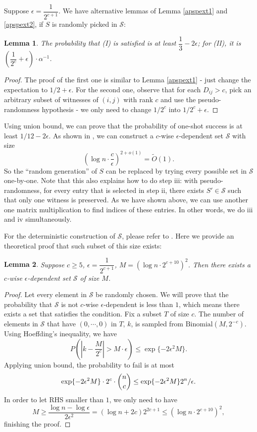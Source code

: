 \documentclass[11pt]{article}
\theoremstyle{plain}
\newtheorem{lemma}{Lemma}[section]
\begin{document}
Suppose $\epsilon=\dfrac{1}{2^{c+1}}$. We have alternative lemmas of Lemma \ref{apspext1} and \ref{apspext2}, if $S$ is randomly picked in $\mathcal{S}$:

\begin{lemma}
\label{apspext4}
The probability that (I) is satisfied is at least $\dfrac{1}{3}-2\epsilon$; for (II), it is $(\dfrac{1}{2^c}+\epsilon)\cdot \alpha^{-1}$.
\end{lemma}

\begin{proof}
The proof of the first one is similar to Lemma \ref{apspext1} - just change the expectation to $1/2+\epsilon$. For the second one, observe that for each $D_{ij}>c$, pick an arbitrary subset of witnesses of $(i,j)$ with rank $c$ and use the pseudo-randomness hypothesis - we only need to change $1/2^c$ into $1/2^c+\epsilon$.
\end{proof}

Using union bound, we can prove that the probability of one-shot success is at least $1/12-2\epsilon$. As shown in \cite{10.1145/100216.100244}, we can construct a $c$-wise $\epsilon$-dependent set $\mathcal{S}$ with size
$$(\log n\cdot\dfrac{c}{\epsilon})^{2+o(1)}=\tilde O(1).$$
So the ``random generation'' of $S$ can be replaced by trying every possible set in $\mathcal{S}$ one-by-one. Note that this also explains how to do step iii: with pseudo-randomness, for every entry that is selected in step ii, there exists $S'\in \mathcal{S}$ such that only one witness is preserved. As we have shown above, we can use another one matrix multiplication to find indices of these entries. In other words, we do iii and iv simultaneously.

For the deterministic construction of $\mathcal{S}$, please refer to \cite{10.1145/100216.100244}. Here we provide an theoretical proof that such subset of this size exists:

\begin{lemma}
\label{psr1}
Suppose $c\ge 5$, $\epsilon=\dfrac{1}{2^{c+1}}$, $M=(\log n\cdot 2^{c+10})^2$. Then there exists a $c$-wise $\epsilon$-dependent set $\mathcal{S}$ of size $M$.
\end{lemma}

\begin{proof}
Let every element in $\mathcal{S}$ be randomly chosen. We will prove that the probability that $\mathcal{S}$ is not $c$-wise $\epsilon$-dependent is less than $1$, which means there exists a set that satisfies the condition. Fix a subset $T$ of size $c$. The number of elements in $\mathcal{S}$ that have $(0,\cdots,0)$ in $T$, $k$, is sampled from $\text{Binomial}(M,2^{-c})$. Using Hoeffding's inequality, we have
$$P(|k-\dfrac{M}{2^{c}}|>M\cdot \epsilon) \le \exp\{-2\epsilon^2 M\}.$$
Applying union bound, the probability to fail is at most
$$\exp\{-2\epsilon^2 M\}\cdot 2^c\cdot \dbinom{n}{c}\le \exp\{-2\epsilon^2M\}2^n/\epsilon.$$
In order to let RHS smaller than $1$, we only need to have
$$M\ge \dfrac{\log n-\log \epsilon}{2\epsilon^2}=(\log n+2c)2^{2c+1}\le (\log n\cdot 2^{c+10})^2,$$
finishing the proof.
\end{proof}
\end{document}
